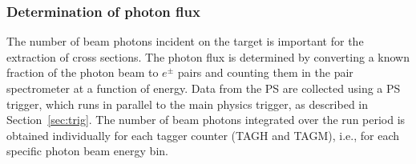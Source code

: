 %
%
%
%

\subsubsection{Determination of photon flux         \label{sec:ps_flux}}
The number of beam photons incident on the \GX{} target is
important for the extraction of cross sections. The photon flux
is determined by converting a known fraction of the photon beam to
$e^\pm$ pairs and counting them in the pair spectrometer at a function
of energy. Data from the PS are  collected using a PS trigger, which
runs in parallel to the  main \GX{} physics trigger, as described in
Section~\ref{sec:trig}. The number of beam photons integrated over
the run period is obtained individually for each tagger counter (TAGH
and TAGM), i.e., for each specific photon beam energy bin. 

